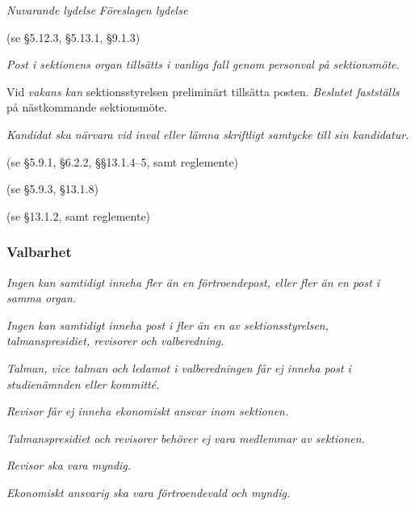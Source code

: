 \documentclass{article}
\newenvironment{lydelse}
    {\begin{paracol}{2}%
        \emph{Nuvarande lydelse}%
        \switchcolumn%
        \emph{Föreslagen lydelse}%
    \end{paracol}%
    \begin{enumerate}[label=\thesubsection.\arabic*]%
    \begin{paracol}{2}%
    }{\end{paracol}\end{enumerate}}
\begin{document}
\begin{lydelse}
    (se \S 5.12.3, \S 5.13.1, \S 9.1.3)
  \switchcolumn
    \item \emph{Post i sektionens organ tillsätts i vanliga fall genom personval på sektionsmöte.} \label{4.x:tillsätt}

    \item Vid \emph{vakans kan} sektionsstyrelsen preliminärt tillsätta posten.
      \emph{Beslutet fastställs} på nästkommande sektionsmöte. \label{4.x:styretval}

    \item \emph{Kandidat ska närvara vid inval eller lämna skriftligt samtycke till sin kandidatur.} \label{4.x:samtycke}

  \switchcolumn*
    \item[] (se \S 5.9.1, \S 6.2.2, \S\S 13.1.4--5, samt reglemente)
    \item[] (se \S 5.9.3, \S 13.1.8)
    \item[] (se \S 13.1.2, samt reglemente)
    \switchcolumn  
    \subsubsection*{Valbarhet}
    \item \emph{Ingen kan samtidigt inneha fler än en förtroendepost, eller fler än en post i samma organ.}
    \label{S:ValbarhetMaxEnFortroende}

    \item \emph{Ingen kan samtidigt inneha post i fler än en av sektionsstyrelsen, talmanspresidiet, revisorer och valberedning.} \label{4.x:valbar.dubbel}

    \item \emph{Talman, vice talman och ledamot i valberedningen får ej inneha post i studienämnden eller kommitté.} \label{4.x:valbar.ober}

    \item \emph{Revisor får ej inneha ekonomiskt ansvar inom sektionen.}
      
    \item \emph{Talmanspresidiet och revisorer behöver ej vara medlemmar av sektionen.}

    \item \emph{Revisor ska vara myndig.} \label{4.x:valbar.revisormyndig}
      
    \item \emph{Ekonomiskt ansvarig ska vara förtroendevald och myndig.}
    \label{S:ValbarEkonomiskMyndig}
\end{lydelse}
\end{document}
